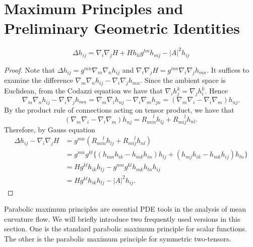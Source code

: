 \section{Maximum Principles and Preliminary Geometric Identities}

\begin{lemma}
	\[\Delta h_{ij}^{} = \nabla_{i}\nabla_{j} H + H h_{li}^{} g_{}^{lm } h_{mj}^{} - \left| A \right| ^2 h_{ij}^{} \]
\end{lemma}

\begin{proof}
	Note that $\Delta h_{ij}^{} = g_{}^{mn} \nabla_{m}\nabla_{n} h_{ij}^{} $ and $\nabla_{i}\nabla_{j} H = g_{}^{mn } \nabla_{i}\nabla_{j} h_{mn }^{} $. It suffices to examine the difference $\nabla_{m}\nabla_{n} h_{ij}^{} - \nabla_{i}\nabla_{j} h_{mn}^{} .$ Since the ambient space is Euclidean, from the Codazzi equation we have that $\nabla_{i}^{} h_{j}^{k} = \nabla_{j}^{} h_{i}^{k}$. Hence \[\nabla_{m}\nabla_{n} h_{ij}^{} - \nabla_{i}\nabla_{j} h_{mn}^{} = \nabla_{m}\nabla_{i} h_{nj}^{} - \nabla_{i}\nabla_{m} h_{jn}^{}=(\nabla_{m}\nabla_{i}  - \nabla_{i}\nabla_{m})h_{nj}^{}.\] By the product rule of connections acting on tensor product, we have that \[(\nabla_{m}\nabla_{i}  - \nabla_{i}\nabla_{m})h_{nj}^{} = R_{min}^{\quad\  l} h_{lj}^{} + R_{mij}^{\quad \ l} h_{nl }^{}.  \]
	Therefore, by Gauss equation
	\begin{equation*}
		\begin{split}
			\Delta h_{ij}^{} - \nabla_{i}\nabla_{j} H
			&= g_{}^{mn} (R_{min }^{\quad \ l} h_{lj}^{} + R_{mij}^{\quad \ l} h_{nl }^{} ) \\
			&= g_{}^{mn } g_{}^{kl} \{(h_{mn}^{} h_{ik }^{} -h_{mk }^{} h_{in }^{} )h_{lj}^{} + (h_{mj }^{} h_{ik }^{} - h_{mk }^{} h_{ij}^{} )h_{ln}^{} \}\\
			&= H g_{}^{kl} h_{ik }^{}  h_{lj}^{} - g_{}^{mn } g_{}^{kl } h_{mk }^{} h_{ln }^{} h_{ij}^{} \\
			&= H g_{}^{kl} h_{ik }^{}  h_{lj}^{} - \left| A \right| ^2 h_{ij}^{} .
		\end{split}
	\end{equation*}
\end{proof}

Parabolic maximum principles are essential PDE tools in the analysis of mean curvature flow. We will briefly introduce two frequently used versions in this section. One is the standard parabolic maximum principle for scalar functions. The other is the parabolic maximum principle for symmetric two-tensors.

